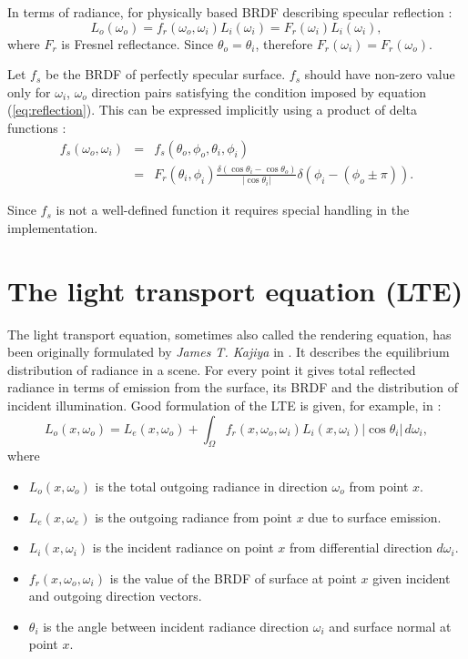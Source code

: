 In terms of radiance, for physically based BRDF describing specular reflection \parencite{phar2010}:
\begin{equation}
  L_{o}(\omega_{o}) = f_{r}(\omega_{o}, \omega_{i}) L_{i}(\omega_{i}) = F_{r}(\omega_{i}) L_{i}(\omega_{i}),
\end{equation}
where $F_{r}$ is Fresnel reflectance. Since $\theta_{o} = \theta_{i}$, therefore $F_{r}(\omega_{i}) = F_{r}(\omega_{o})$.

Let $f_{s}$ be the BRDF of perfectly specular surface. $f_{s}$ should have non-zero value only for $\omega_{i}$, $\omega_{o}$ direction pairs satisfying the condition imposed by equation (\ref{eq:reflection}). This can be expressed implicitly using a product of delta functions \parencite{cohen93}:
\begin{eqnarray}
  f_{s}(\omega_{o}, \omega_{i}) &=& f_{s}(\theta_{o}, \phi_{o}, \theta_{i}, \phi_{i}) \nonumber \\
  &=& F_{r}(\theta_{i}, \phi_{i}) \frac{\delta(\cos\theta_{i} - \cos\theta_{o})}{|\cos\theta_{i}|} \delta(\phi_{i} - (\phi_{o} \pm \pi)).
\end{eqnarray}

Since $f_{s}$ is not a well-defined function it requires special handling in the implementation.

\section{The light transport equation (LTE)}
The light transport equation, sometimes also called the rendering equation, has been originally formulated by \emph{James T. Kajiya} in \cite{kajiya86}. It describes the equilibrium distribution of radiance in a scene. For every point it gives total reflected radiance in terms of emission from the surface, its BRDF and the distribution of incident illumination. Good formulation of the LTE is given, for example, in \cite{phar2010}:
\begin{equation}
  L_{o}(x, \omega_{o}) = L_{e}(x, \omega_{o}) + \int_{\Omega} f_{r}(x, \omega_{o}, \omega_{i}) L_{i}(x, \omega_{i}) |\cos\theta_{i}| \,d\omega_{i},
\end{equation}
where
\begin{itemize}
\item $L_{o}(x, \omega_{o})$ is the total outgoing radiance in direction $\omega_{o}$ from point $x$.
\item $L_{e}(x, \omega_{e})$ is the outgoing radiance from point $x$ due to surface emission.
\item $L_{i}(x, \omega_{i})$ is the incident radiance on point $x$ from differential direction $d\omega_{i}$.
\item $f_{r}(x, \omega_{o}, \omega_{i})$ is the value of the BRDF of surface at point $x$ given incident and outgoing direction vectors.
\item $\theta_{i}$ is the angle between incident radiance direction $\omega_{i}$ and surface normal at point $x$.
\end{itemize}

